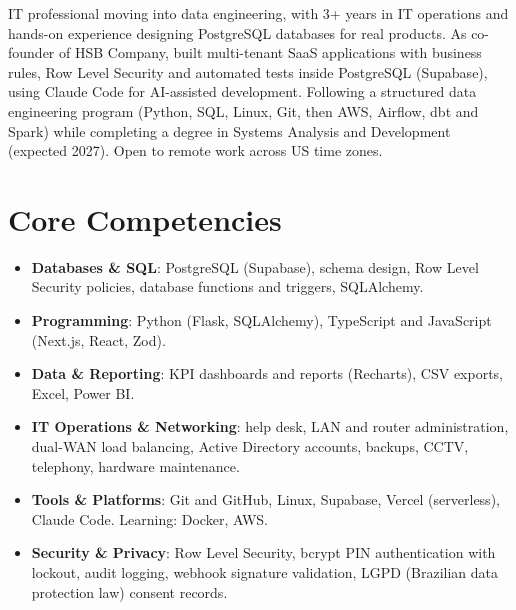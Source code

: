 \documentclass[11pt,a4paper,sans]{moderncv}
\begin{document}
\makecvtitle


\vspace{6pt}
\small{IT professional moving into data engineering, with 3+ years in IT operations and hands-on experience designing PostgreSQL databases for real products. As co-founder of HSB Company, built multi-tenant SaaS applications with business rules, Row Level Security and automated tests inside PostgreSQL (Supabase), using Claude Code for AI-assisted development. Following a structured data engineering program (Python, SQL, Linux, Git, then AWS, Airflow, dbt and Spark) while completing a degree in Systems Analysis and Development (expected 2027). Open to remote work across US time zones.}


\section{Core Competencies}
\vspace{1pt}
\begin{itemize}

\item \textbf{Databases \& SQL}: PostgreSQL (Supabase), schema design, Row Level Security policies, database functions and triggers, SQLAlchemy.

\item \textbf{Programming}: Python (Flask, SQLAlchemy), TypeScript and JavaScript (Next.js, React, Zod).

\item \textbf{Data \& Reporting}: KPI dashboards and reports (Recharts), CSV exports, Excel, Power BI.

\item \textbf{IT Operations \& Networking}: help desk, LAN and router administration, dual-WAN load balancing, Active Directory accounts, backups, CCTV, telephony, hardware maintenance.

\item \textbf{Tools \& Platforms}: Git and GitHub, Linux, Supabase, Vercel (serverless), Claude Code. Learning: Docker, AWS.

\item \textbf{Security \& Privacy}: Row Level Security, bcrypt PIN authentication with lockout, audit logging, webhook signature validation, LGPD (Brazilian data protection law) consent records.

\end{itemize}
\end{document}
